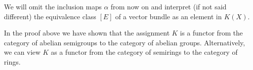 \begin{remark}
	We will omit the inclusion maps $\alpha$ from now on and interpret (if not said different) the equivalence class $[E]$ of a vector bundle as an element in $K(X)$.
\end{remark}

\begin{corollary}
	In the proof above we have shown that the assignment $K$ is a functor from the category of abelian semigroups to the category of abelian groups. Alternatively, we can view $K$ as a functor from the category of semirings to the category of rings.
\end{corollary}
